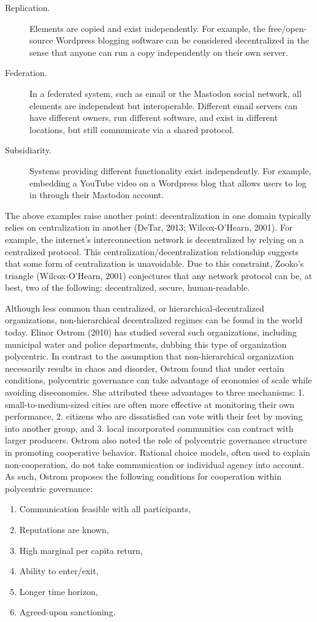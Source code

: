 \begin{description}
\item[Replication.]{Elements are copied and exist independently. For example, the free/open-source Wordpress blogging software can be considered decentralized in the sense that anyone can run a copy independently on their own server.}
\item[Federation.]{In a federated system, such as email or the Mastodon social network, all elements are independent but interoperable. Different email servers can have different owners, run different software, and exist in different locations, but still communicate via a shared protocol.}
\item[Subsidiarity.]{Systems providing different functionality exist independently. For example, embedding a YouTube video on a Wordpress blog that allows users to log in through their Mastodon account.}
\end{description}

The above examples raise another point: decentralization in one domain typically relies on centralization in another (DeTar, 2013; Wilcox-O'Hearn, 2001). For example, the internet's interconnection network is decentralized by relying on a centralized protocol. This centralization/decentralization relationship suggests that some form of centralization is unavoidable. Due to this constraint, Zooko's triangle (Wilcox-O'Hearn, 2001) conjectures that any network protocol can be, at best, two of the following: decentralized, secure, human-readable.

Although less common than centralized, or hierarchical-decentralized organizations, non-hierarchical decentralized regimes can be found in the world today. Elinor Ostrom (2010) has studied several such organizations, including municipal water and police departments, dubbing this type of organization polycentric. In contrast to the assumption that non-hierarchical organization necessarily results in chaos and disorder, Ostrom found that under certain conditions, polycentric governance can take advantage of economies of scale while avoiding diseconomies. She attributed these advantages to three mechanisms: 1. small-to-medium-sized cities are often more effective at monitoring their own performance, 2. citizens who are dissatisfied can vote with their feet by moving into another group, and 3. local incorporated communities can contract with larger producers. Ostrom also noted the role of polycentric governance structure in promoting cooperative behavior. Rational choice models, often used to explain non-cooperation, do not take communication or individual agency into account. As such, Ostrom proposes the following conditions for cooperation within polycentric governance:
\begin{enumerate}
\item{Communication feasible with all participants,}
\item{Reputations are known,}
\item{High marginal per capita return,}
\item{Ability to enter/exit,}
\item{Longer time horizon,}
\item{Agreed-upon sanctioning.}
\end{enumerate}

